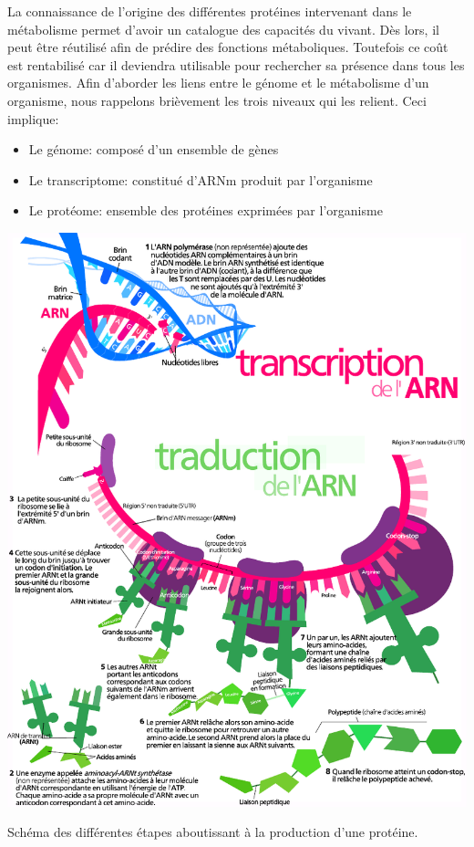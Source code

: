 \begin{refsection}
    La connaissance de l'origine des différentes protéines intervenant dans le métabolisme permet d'avoir un catalogue des capacités du vivant. Dès lors, il peut être réutilisé afin de prédire des fonctions métaboliques. Toutefois ce coût est rentabilisé car il deviendra utilisable pour rechercher sa présence dans tous les organismes. Afin d'aborder les liens entre le génome et le métabolisme d'un organisme, nous rappelons brièvement les trois niveaux qui les relient. Ceci implique:
    
    \begin{itemize}
        \item Le génome: composé d'un ensemble de gènes
        \item Le transcriptome: constitué d'\gls{ARNm} produit par l'organisme
        \item Le protéome: ensemble des protéines exprimées par l'organisme
    \end{itemize}
    
    \begin{shadedfigure}
        \centering
        \includegraphics[width=\textwidth]{img/production_proteine2.pdf}
        \caption{Schéma des différentes étapes aboutissant à la production d’une protéine.}
        \label{fig:production_proteine}
    \end{shadedfigure}
    

\end{refsection}
